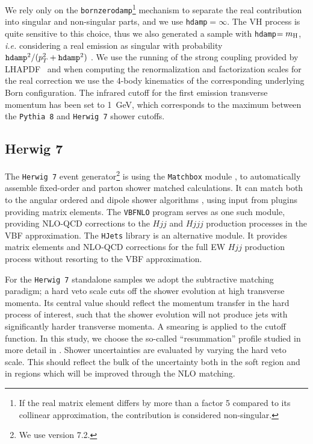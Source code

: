 \documentclass[10pt,prd,fleqn,superscriptaddress,notitlepage,nofootinbib,preprintnumbers,nobalancelastpage]{revtex4-1}
\newcommand{\PY}{\texttt{Pythia 8}\xspace}
\newcommand{\HW}{\texttt{Herwig 7}\xspace}
\newcommand{\HJets}{\texttt{HJets}\xspace}
\newcommand{\VBFNLO}{\texttt{VBFNLO}\xspace}
\newcommand{\VBF}{VBF\xspace}
\newcommand{\VH}{VH\xspace}
\begin{document}
We rely only on the {\tt bornzerodamp}\footnote{If the real matrix element differs by more than a factor 5 compared to its collinear approximation, the contribution is considered non-singular.} mechanism to separate the real contribution into singular and non-singular parts, and we use {\tt hdamp}$=\infty$.
 The \VH{} process is quite sensitive to this choice, thus we also generated a sample with {\tt hdamp}$=m_{\text H}$, \emph{i.e.} considering a real emission as singular with probability ${\tt hdamp}^2/(p_T^2+{\tt hdamp}^2)$ . We use the running of the strong coupling provided by LHAPDF~\cite{Buckley:2014ana} and when computing the renormalization and factorization scales for the real correction we use the 4-body kinematics of the corresponding underlying Born configuration.
 The infrared cutoff for the first emission transverse momentum has been set to 1~GeV, which corresponds to the maximum between the \PY{} and \HW{} shower cutoffs.


\subsection{Herwig 7}
The \HW{} event generator\footnote{We use version 7.2.}
\cite{Bahr:2008pv,Bellm:2019zci} is using the \texttt{Matchbox} module \cite{Platzer:2011bc},
to automatically assemble fixed-order and parton shower matched
calculations. It can match both to the angular ordered \cite{Gieseke:2003rz} and
dipole shower algorithms \cite{Platzer:2009jq}, using input from
plugins providing matrix elements. The \VBFNLO{} program
\cite{Arnold:2008rz,Baglio:2014uba} serves as one such module,
providing NLO-QCD corrections to the $Hjj$ and $Hjjj$ production
processes in the \VBF approximation. The \HJets{} library
\cite{Campanario:2013fsa} is an alternative module. It provides matrix
elements and NLO-QCD corrections for the full EW $Hjj$
production process without resorting to the \VBF approximation.

For the \HW{} standalone samples we adopt the subtractive matching paradigm;
a hard veto scale cuts off the shower evolution at high transverse momenta. Its
central value should reflect the momentum transfer in the
hard process of interest, such that the shower evolution will not produce
jets with significantly harder transverse momenta. A smearing is
applied to the cutoff function. In this study, we choose the
so-called ``resummation'' profile studied in more detail in
\cite{Bellm:2016rhh,Cormier:2018tog}. Shower uncertainties are
evaluated by varying the hard veto scale. This should reflect the
bulk of the uncertainty both in the soft region and in regions which
will be improved through the NLO matching.
\end{document}

